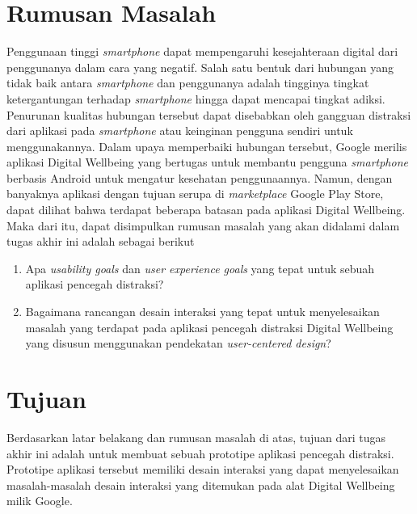 \section{Rumusan Masalah}

Penggunaan tinggi \textit{smartphone} dapat mempengaruhi kesejahteraan digital dari penggunanya dalam cara yang negatif. Salah satu bentuk dari hubungan yang tidak baik antara \textit{smartphone} dan penggunanya adalah tingginya tingkat ketergantungan terhadap \textit{smartphone} hingga dapat mencapai tingkat adiksi. Penurunan kualitas hubungan tersebut dapat disebabkan oleh gangguan distraksi dari aplikasi pada \textit{smartphone} atau keinginan pengguna sendiri untuk menggunakannya. Dalam upaya memperbaiki hubungan tersebut, Google merilis aplikasi Digital Wellbeing yang bertugas untuk membantu pengguna \textit{smartphone} berbasis Android untuk mengatur kesehatan penggunaannya. Namun, dengan banyaknya aplikasi dengan tujuan serupa di \textit{marketplace} Google Play Store, dapat dilihat bahwa terdapat beberapa batasan pada aplikasi Digital Wellbeing. Maka dari itu, dapat disimpulkan rumusan masalah yang akan didalami dalam tugas akhir ini adalah sebagai berikut

\begin{enumerate}
  \item Apa \textit{usability goals} dan \textit{user experience goals} yang tepat untuk sebuah aplikasi pencegah distraksi?
  \item Bagaimana rancangan desain interaksi yang tepat untuk menyelesaikan masalah yang terdapat pada aplikasi pencegah distraksi Digital Wellbeing yang disusun menggunakan pendekatan \textit{user-centered design}?
\end{enumerate}

\section{Tujuan}

Berdasarkan latar belakang dan rumusan masalah di atas, tujuan dari tugas akhir ini adalah untuk membuat sebuah prototipe aplikasi pencegah distraksi. Prototipe aplikasi tersebut memiliki desain interaksi yang dapat menyelesaikan masalah-masalah desain interaksi yang ditemukan pada alat Digital Wellbeing milik Google.


